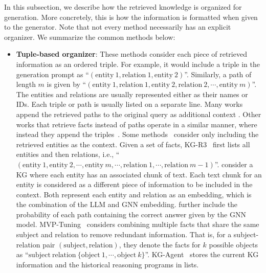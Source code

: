 In this subsection, we describe how the retrieved knowledge is organized for generation. More concretely, this is how the information is formatted when given to the generator. Note that not every method necessarily has an explicit organizer. We summarize the common methods below:
\begin{itemize}[leftmargin=*]
    \item {\bf Tuple-based organizer}: These methods consider each piece of retrieved information as an ordered triple. For example, it would include a triple in the generation prompt as ``$(\text{entity} \: 1, \text{relation} \: 1, \text{entity} \: 2)$''. Similarly, a path of length $m$ is given by ``$(\text{entity} \: 1, \text{relation} \: 1, \text{entity} \: 2, \text{relation} \: 2, \cdots, \text{entity} \: m)$''. The entities and relations are usually represented either as their names or IDs. Each triple or path is usually listed on a separate line. Many works append the retrieved paths to the original query as additional context \cite{sunthink, jiang2024hykge, mavromatis2024gnn, sanmartin2024kg, luoreasoning, choudhary2023complex, gnn_llm, wang2024reasoning, zhu2024knowagent}. Other works that retrieve facts instead of paths operate in a similar manner, where instead they append the triples~\cite{niu2024mitigating, zhu2024realm, dai2024counter, liao2024gentkg, kgrank, jiang2023structgpt, kim2023kg, gao2024two}. Some methods~\cite{zhu2024emerge, tian2024graph} consider only including the retrieved entities as the context. Given a set of facts, KG-R3~\cite{pahuja2023retrieve} first lists all entities and then relations, i.e., ``$(\text{entity} \: 1, \text{entity} \: 2, \cdots , \text{entity} \: m, \cdots, \text{relation} \: 1, \cdots, \text{relation} \: m-1)$''. 
    \citet{delile2024graph} consider a KG where each entity has an associated chunk of text. Each text chunk for an entity is considered as a different piece of information to be included in the context. Both \cite{tian2024graph, gao2024two} represent each entity and relation as an embedding, which is the combination of the LLM and GNN embedding. \citet{gnn_llm} further include the probability of each path containing the correct answer given by the GNN model. MVP-Tuning~\cite{mvp_tuning} considers combining multiple facts that share the same subject and relation to remove redundant information. That is, for a subject-relation pair $(\text{subject}, \text{relation})$, they denote the facts for $k$ possible objects as ``$\text{subject} \: \text{relation} \: \{\text{object} \: 1,  \cdots, \text{object} \: k\}$''. KG-Agent~\cite{kgagent} stores the current KG information and the historical reasoning programs in lists.


\end{itemize}
